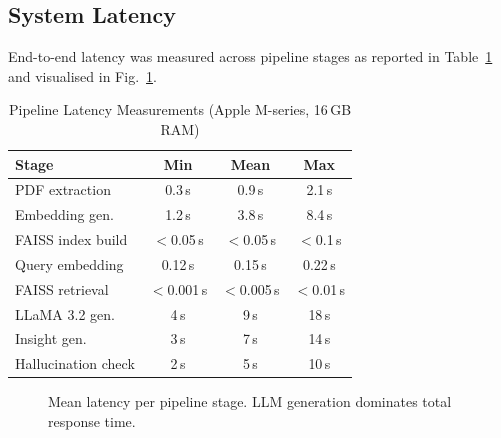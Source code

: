\documentclass[conference]{IEEEtran}
\begin{document}
\subsection{System Latency}
End-to-end latency was measured across pipeline stages as reported in
Table~\ref{tab:latency} and visualised in Fig.~\ref{fig:latency}.

\begin{table}[h]
\caption{Pipeline Latency Measurements (Apple M-series, 16\,GB RAM)}
\label{tab:latency}
\centering
\begin{tabular}{lccc}
\toprule
\textbf{Stage} & \textbf{Min} & \textbf{Mean} & \textbf{Max} \\
\midrule
PDF extraction      & 0.3\,s  & 0.9\,s  & 2.1\,s  \\
Embedding gen.      & 1.2\,s  & 3.8\,s  & 8.4\,s  \\
FAISS index build   & $<$0.05\,s & $<$0.05\,s & $<$0.1\,s \\
Query embedding     & 0.12\,s & 0.15\,s & 0.22\,s \\
FAISS retrieval     & $<$0.001\,s & $<$0.005\,s & $<$0.01\,s \\
LLaMA 3.2 gen.      & 4\,s    & 9\,s    & 18\,s   \\
Insight gen.        & 3\,s    & 7\,s    & 14\,s   \\
Hallucination check & 2\,s    & 5\,s    & 10\,s   \\
\bottomrule
\end{tabular}
\end{table}

\begin{figure}[h]
\centering
{}
\caption{Mean latency per pipeline stage. LLM generation dominates total
         response time.}
\label{fig:latency}
\end{figure}
\end{document}
